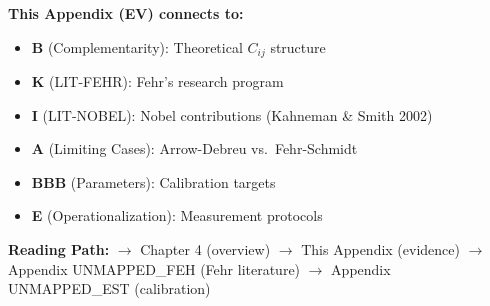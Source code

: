 \begin{tcolorbox}[colback=gray!10!white, colframe=gray!75!black,
    title=\textbf{Cross-Reference Footer}]
\label{sec:EV-footer}

\textbf{This Appendix (EV) connects to:}
\begin{itemize}[nosep]
    \item \textbf{B} (Complementarity): Theoretical $C_{ij}$ structure
    \item \textbf{K} (LIT-FEHR): Fehr's research program
    \item \textbf{I} (LIT-NOBEL): Nobel contributions (Kahneman \& Smith 2002)
    \item \textbf{A} (Limiting Cases): Arrow-Debreu vs.\ Fehr-Schmidt
    \item \textbf{BBB} (Parameters): Calibration targets
    \item \textbf{E} (Operationalization): Measurement protocols
\end{itemize}

\textbf{Reading Path:}
$\rightarrow$ Chapter 4 (overview) $\rightarrow$ This Appendix (evidence)
$\rightarrow$ Appendix UNMAPPED_FEH (Fehr literature) $\rightarrow$ Appendix UNMAPPED_EST (calibration)

\end{tcolorbox}

